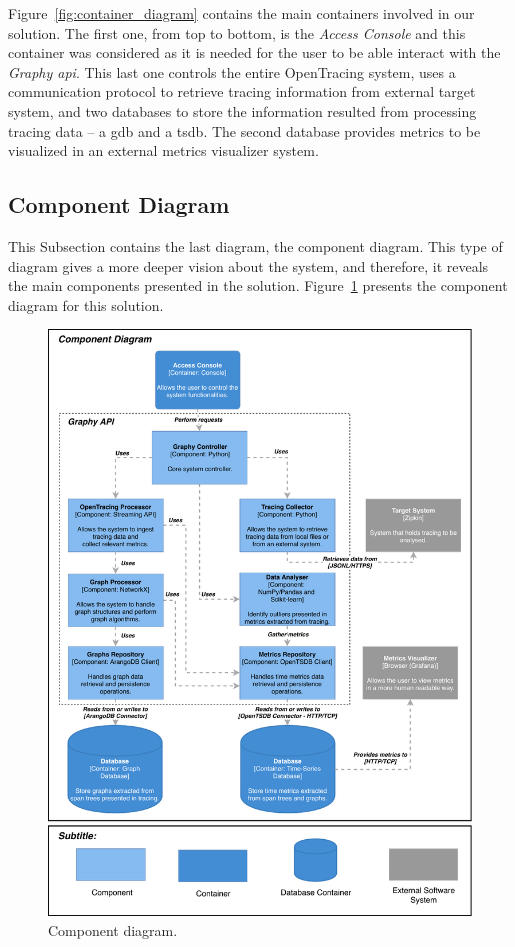 Figure~\ref{fig:container_diagram} contains the main containers involved in our solution. The first one, from top to bottom, is the \emph{Access Console} and this container was considered as it is needed for the user to be able interact with the \emph{Graphy \gls{api}}. This last one controls the entire OpenTracing system, uses a communication protocol to retrieve tracing information from external target system, and two databases to store the information resulted from processing tracing data -- a \gls{gdb} and a \gls{tsdb}. The second database provides metrics to be visualized in an external metrics visualizer system.

\subsection{Component Diagram}
\label{subsec:component_diagram}

This Subsection contains the last diagram, the component diagram. This type of diagram gives a more deeper vision about the system, and therefore, it reveals the main components presented in the solution. Figure~\ref{fig:component_diagram} presents the component diagram for this solution.

\begin{figure}[]
    \centering
    \includegraphics[width=1.00\textwidth]{images/component_diagram.pdf}
    \caption{Component diagram.}
    \label{fig:component_diagram}
\end{figure}

